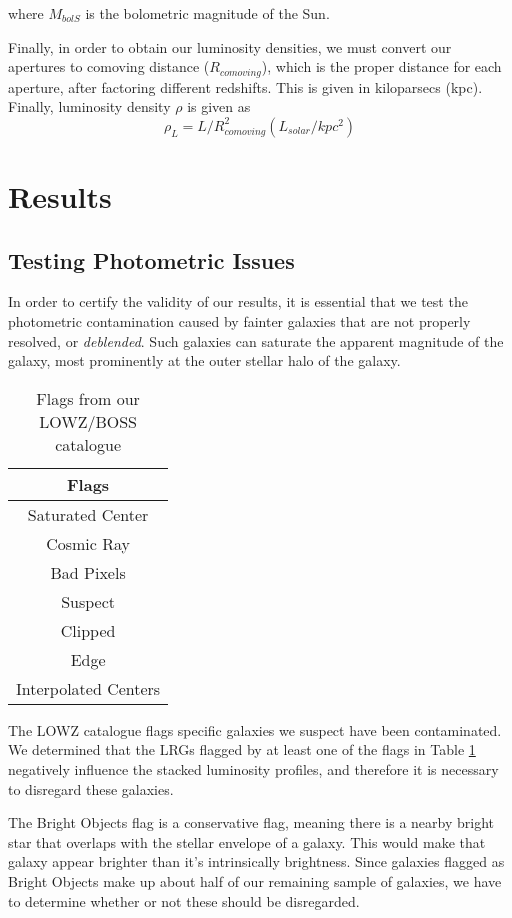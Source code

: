 \documentclass{article}
\begin{document}
where $\textit{M}_{bolS}$ is the bolometric magnitude of the Sun. 

Finally, in order to obtain our luminosity densities, we must convert our apertures to comoving distance ($R_{comoving}$), which is the proper distance for each aperture, after factoring different redshifts. This is given in kiloparsecs (kpc). Finally, luminosity density $\rho$ is given as
\begin{equation}
\rho_L=L/R_{comoving}^2 ( L_{solar}/kpc^2)
\end{equation}

\section{Results}
\subsection{Testing Photometric Issues}
In order to certify the validity of our results, it is essential that we test the photometric contamination caused by fainter galaxies that are not properly resolved, or \textit{deblended}. Such galaxies can saturate the apparent magnitude of the galaxy, most prominently at the outer stellar halo of the galaxy.

\begin{table}[!htb]
\centering
\begin{tabular}{c} \toprule
\textbf{Flags} \\ \midrule
Saturated Center\\
Cosmic Ray \\
Bad Pixels \\
Suspect \\
Clipped\\
Edge\\
Interpolated Centers \\ \bottomrule
\end{tabular}
\caption{Flags from our LOWZ/BOSS catalogue}
\label{table:2}
\hfill
\end{table}

The LOWZ catalogue flags specific galaxies we suspect have been contaminated. We determined that the LRGs flagged by at least one of the flags in Table \ref{table:2} negatively influence the stacked luminosity profiles, and therefore it is necessary to disregard these galaxies. 

The Bright Objects flag is a conservative flag, meaning there is a nearby bright star that overlaps with the stellar envelope of a galaxy. This would make that galaxy appear brighter than it's intrinsically brightness. Since galaxies flagged as Bright Objects make up about half of our remaining sample of galaxies, we have to determine whether or not these should be disregarded. 
\end{document}
